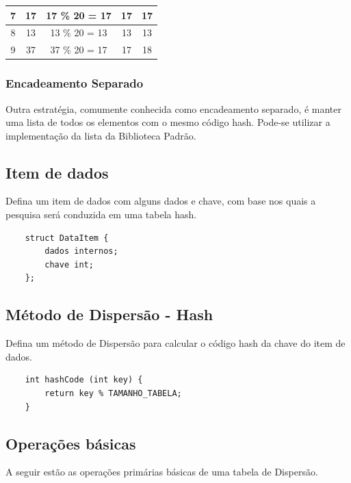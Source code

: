 \documentclass[a4paper, 12pt]{article}
\begin{document}
\begin{center}
\begin{longtable}[c]{@{}ccccc@{}}
	\multicolumn{1}{|c|}{7} & \multicolumn{1}{c|}{17} & \multicolumn{1}{c|}{17 \% 20 = 17} & \multicolumn{1}{c|}{17} & \multicolumn{1}{c|}{17}                          \\* \midrule
	\multicolumn{1}{|c|}{8} & \multicolumn{1}{c|}{13} & \multicolumn{1}{c|}{13 \% 20 = 13} & \multicolumn{1}{c|}{13} & \multicolumn{1}{c|}{13}                          \\* \midrule
	\multicolumn{1}{|c|}{9} & \multicolumn{1}{c|}{37} & \multicolumn{1}{c|}{37 \% 20 = 17} & \multicolumn{1}{c|}{17} & \multicolumn{1}{c|}{18}                          \\* \bottomrule
\end{longtable}

\end{center}




\subsubsection{Encadeamento Separado }



Outra estratégia, comumente conhecida como encadeamento separado, é manter uma lista de todos os elementos com o mesmo código hash. Pode-se utilizar a implementação da lista da Biblioteca Padrão. 

\subsection{Item de dados}

Defina um item de dados com alguns dados e chave, com base nos quais a pesquisa será conduzida em uma tabela hash.

\begin{lstlisting}
	struct DataItem {
		dados internos;
		chave int;
	};
\end{lstlisting}

\subsection{Método de Dispersão - Hash}

Defina um método de Dispersão para calcular o código hash da chave do item de dados.

\begin{lstlisting}
	int hashCode (int key) {
		return key % TAMANHO_TABELA;
	}
\end{lstlisting}


\subsection{Operações básicas}
A seguir estão as operações primárias básicas de uma tabela de Dispersão.\\
\end{document}
